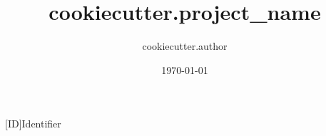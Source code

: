 \documentclass[10pt, t]{article}
\title{ {{cookiecutter.project_name}} }
\author{ {{cookiecutter.author}} }
\date{\today}
\begin{document}
\begin{frame}
	\maketitle
\end{frame}

\begin{acronym}
	[ID]{Identifier}
\end{acronym}
\end{document}
